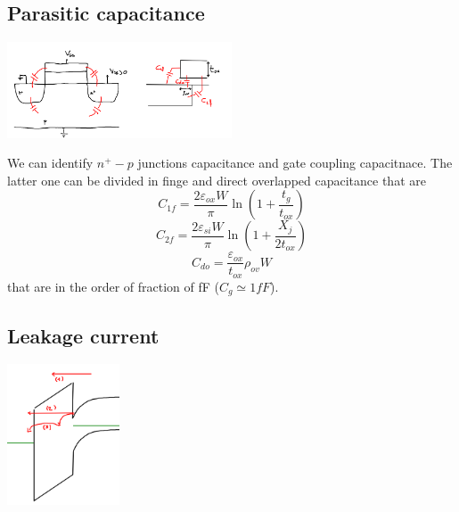 \subsection{Parasitic capacitance}


\centering
\includegraphics[width=0.5\textwidth]{parC.png}\\
\raggedright


We can identify $n^+-p$ junctions capacitance and gate coupling capacitnace.
The latter one can be divided in finge and direct overlapped capacitance that are
\begin{equation}
C_{1f}=\frac{2\varepsilon_{ox}W}{\pi}\ln(1+\frac{t_g}{t_{ox}})
\end{equation}
\begin{equation}
C_{2f}=\frac{2\varepsilon_{si}W}{\pi}\ln(1+\frac{X_j}{2t_{ox}})
\end{equation}
\begin{equation}
C_{do}=\frac{\varepsilon_{ox}}{t_{ox}}\rho_{ov}W
\end{equation}
that are in the order of fraction of fF ($C_{g}\simeq 1 fF$).

\subsection{Leakage current}


\centering
\includegraphics[width=0.25\textwidth]{leak1.png}\\
\raggedright


